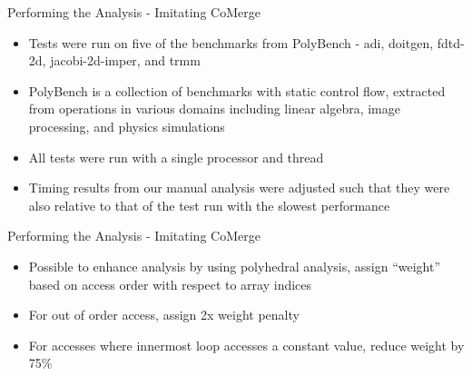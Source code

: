 \documentclass[final]{beamer}
\let\olditem\item
\renewcommand{\item}{\vspace{\fill}\olditem}
\begin{document}
\begin{frame}{\hspace{0.02\paperwidth}Performing the Analysis - Imitating CoMerge}
\begin{itemize}
\item Tests were run on five of the benchmarks from PolyBench - adi, doitgen, fdtd-2d, jacobi-2d-imper, and trmm
\item PolyBench is a collection of benchmarks with static control flow, extracted from operations in various domains including linear algebra, image processing, and physics simulations
\item All tests were run with a single processor and thread
\item Timing results from our manual analysis were adjusted such that they were also relative to that of the test run with the slowest performance
\end{itemize}
\end{frame}

\begin{frame}{\hspace{0.02\paperwidth}Performing the Analysis - Imitating CoMerge}
\begin{itemize}
\item Possible to enhance analysis by using polyhedral analysis, assign ``weight'' based on access order with respect to array indices
\item For out of order access, assign 2x weight penalty
\item For accesses where innermost loop accesses a constant value, reduce weight by 75\%
\end{itemize}
\end{frame}
\end{document}
